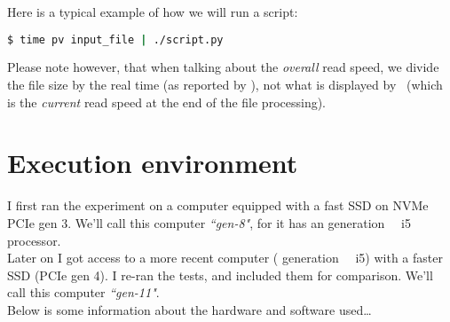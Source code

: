 Here is a typical example of how we will run a script:

\begin{lstlisting}[language=sh]
$ time pv input_file | ./script.py
\end{lstlisting}





Please note however, that when talking about the \emph{overall} read speed, we divide the file size by the real time (as reported by ), not what is displayed by \pv\ (which is the \emph{current} read speed at the end of the file processing). 


\section*{Execution environment} \label{execution-environment}


I first ran the experiment on a computer equipped with a fast SSD on NVMe PCIe gen 3. 
We'll call this computer \emph{``gen-8"}, for it has an  generation \Intel\ \Core~i5 processor. \\

Later on I got access to a more recent computer ( generation \Intel\ \Core~i5) with a faster SSD (PCIe gen 4). I re-ran the tests, and included them for comparison.
We'll call this computer \emph{``gen-11"}. \\



Below is some information about the hardware and software used\ldots

